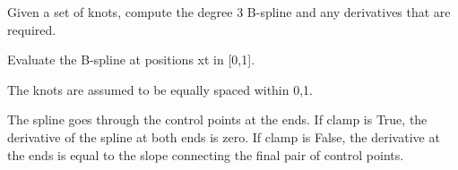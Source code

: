 \documentclass[letterpaper,10pt,english]{sphinxmanual}
\begin{document}
Given a set of knots, compute the degree 3 B-spline and any derivatives
that are required.

\begin{fulllineitems}
\label{api/bspline:refl1d.bspline.bspline}
Evaluate the B-spline at positions xt in {[}0,1{]}.

The knots are assumed to be equally spaced within 0,1.

The spline goes through the control points at the ends.  If clamp is True,
the derivative of the spline at both ends is zero.  If clamp is False,
the derivative at the ends is equal to the slope connecting the final
pair of control points.

\end{fulllineitems}


\begin{fulllineitems}
\label{api/bspline:refl1d.bspline.bspline_control}
\end{fulllineitems}


\begin{fulllineitems}
\label{api/bspline:refl1d.bspline.demo}
\end{fulllineitems}


\begin{fulllineitems}
\label{api/bspline:refl1d.bspline.demo_interp}
\end{fulllineitems}


\begin{fulllineitems}
\label{api/bspline:refl1d.bspline.max}
\end{fulllineitems}

\end{document}
